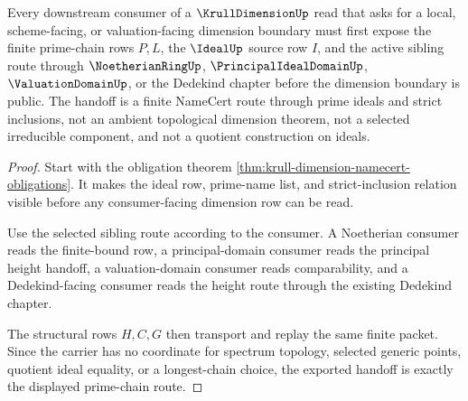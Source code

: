 \begin{theorem}\label{thm:krull-dimension-prime-chain-handoff}
Every downstream consumer of a $\KrullDimensionUp$ read that asks for a local, scheme-facing, or valuation-facing dimension boundary must first expose the finite prime-chain rows $P,L$, the $\IdealUp$ source row $I$, and the active sibling route through $\NoetherianRingUp$, $\PrincipalIdealDomainUp$, $\ValuationDomainUp$, or the Dedekind chapter before the dimension boundary is public. The handoff is a finite NameCert route through prime ideals and strict inclusions, not an ambient topological dimension theorem, not a selected irreducible component, and not a quotient construction on ideals.
\end{theorem}
\begin{proof}
Start with the obligation theorem \autoref{thm:krull-dimension-namecert-obligations}. It makes the ideal row, prime-name list, and strict-inclusion relation visible before any consumer-facing dimension row can be read.

Use the selected sibling route according to the consumer. A Noetherian consumer reads the finite-bound row, a principal-domain consumer reads the principal height handoff, a valuation-domain consumer reads comparability, and a Dedekind-facing consumer reads the height route through the existing Dedekind chapter.

The structural rows $H,C,G$ then transport and replay the same finite packet. Since the carrier has no coordinate for spectrum topology, selected generic points, quotient ideal equality, or a longest-chain choice, the exported handoff is exactly the displayed prime-chain route.
\end{proof}


\begin{closurestatus}{\KrullDimensionUp}
  \theoryclosure{\seedClosure}
  \formalstatus{\unformalizedV}
\end{closurestatus}
